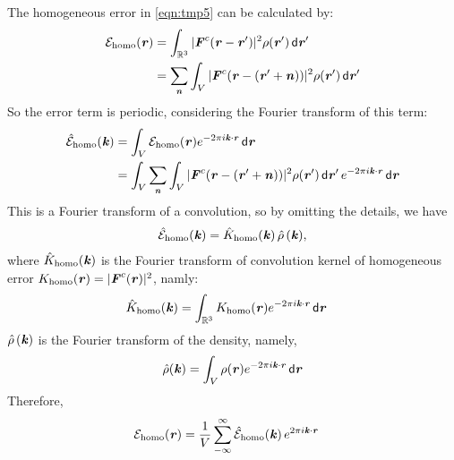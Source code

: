 \documentclass[aps,pre,preprint,unsortedaddress]{revtex4}
\renewcommand{\v}[1]{\textbf{\textit{#1}}}
\renewcommand{\d}[1]{\textsf{#1}}
\begin{document}
The homogeneous error in \eqref{eqn:tmp5} can be calculated by:
\begin{align}\nonumber
  \mathcal E_{\textrm{homo}}(\v r)
  & = \int_{\mathbb R^3}\vert\v F^c(\v r - \v r')\vert^2\rho(\v r')\,\d d\v r' \\ \nonumber
  & = \sum_{\v n} \int_V \vert\v F^c(\v r - (\v r'+\v n))\vert^2\rho(\v r')\,\d d\v r'
\end{align}
So the error term is periodic, considering the Fourier transform of
this term:
\begin{align}\nonumber
  \hat{\mathcal E}_{\textrm{homo}}(\v k)
  & =
  \int_V\mathcal E_{\textrm{homo}}(\v r)e^{-2\pi i\v k\cdot\v r}\,\d d\v r \\ \nonumber
  & =
  \int_V
  \sum_{\v n} \int_V \vert\v F^c(\v r - (\v r'+\v n))\vert^2\rho(\v r')\,\d d\v r'\,
  e^{-2\pi i\v k\cdot\v r}\,\d d\v r
\end{align}
This is a Fourier transform of a convolution, so by omitting the details, we have
\begin{align}
  \hat{\mathcal E}_{\textrm{homo}}(\v k) = \hat K_{\textrm{homo}}(\v k)\,\hat\rho\,(\v k),
\end{align}
where $\hat K_{\textrm{homo}}(\v k)$ is the Fourier transform of
convolution kernel of homogeneous error $K_{\textrm{homo}}(\v r) = \vert\v F^c(\v
r)\vert^2$, namly:
\begin{align}
  \hat K_{\textrm{homo}}(\v k)
  &=
  \int_{\mathbb R^3}K_{\textrm{homo}}(\v r)e^{-2\pi i\v k\cdot\v r}\,\d d\v r
\end{align}
$\hat\rho\,(\v k)$ is the Fourier transform of the density, namely,
\begin{align}
  \hat\rho(\v k) = \int_V\rho(\v r)e^{-2\pi i\v k\cdot\v r}\,\d d\v r
\end{align}
Therefore,
\begin{align}\label{eqn:tmp11}
  \mathcal E_{\textrm{homo}}(\v r)
  &=
  \frac1V\sum_{-\infty}^\infty \hat{\mathcal E}_{\textrm{homo}}(\v k)\,e^{2\pi i\v k\cdot\v r}
\end{align}
\end{document}
